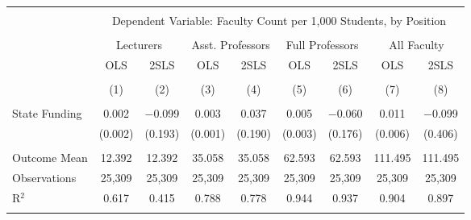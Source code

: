 
\begin{tabular}{@{\extracolsep{5pt}}lcccccccc} 
\\[-1.8ex]\hline 
\hline \\[-1.8ex] 
 & \multicolumn{8}{c}{Dependent Variable: Faculty Count per 1,000 Students, by Position} \\ 
\cline{2-9} 
\\[-1.8ex] & \multicolumn{2}{c}{Lecturers} & \multicolumn{2}{c}{Asst. Professors} & \multicolumn{2}{c}{Full Professors} & \multicolumn{2}{c}{All Faculty} \\ 
 & OLS & 2SLS & OLS & 2SLS & OLS & 2SLS & OLS & 2SLS \\ 
\\[-1.8ex] & (1) & (2) & (3) & (4) & (5) & (6) & (7) & (8)\\ 
\hline \\[-1.8ex] 
 State Funding & 0.002 & $-$0.099 & 0.003 & 0.037 & 0.005 & $-$0.060 & 0.011 & $-$0.099 \\ 
  & (0.002) & (0.193) & (0.001) & (0.190) & (0.003) & (0.176) & (0.006) & (0.406) \\ 
 \hline \\[-1.8ex] 
Outcome Mean & 12.392 & 12.392 & 35.058 & 35.058 & 62.593 & 62.593 & 111.495 & 111.495 \\ 
Observations & 25,309 & 25,309 & 25,309 & 25,309 & 25,309 & 25,309 & 25,309 & 25,309 \\ 
R$^{2}$ & 0.617 & 0.415 & 0.788 & 0.778 & 0.944 & 0.937 & 0.904 & 0.897 \\ 
\hline 
\hline \\[-1.8ex] 
\end{tabular} 
